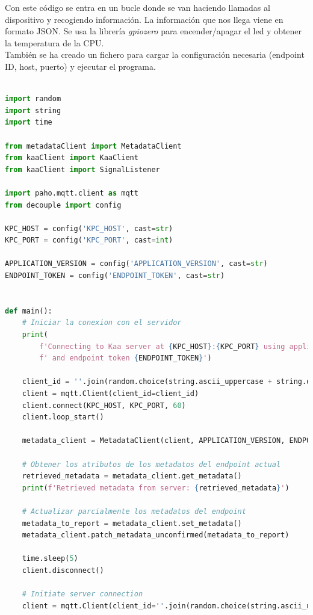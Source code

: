 Con este código se entra en un bucle donde se van haciendo llamadas al dispositivo y recogiendo información. La información que nos llega viene en formato JSON. Se usa la librería \textit{gpiozero} para encender/apagar el led y obtener la temperatura de la CPU. \\

También se ha creado un fichero para cargar la configuración necesaria (endpoint ID, host, puerto) y ejecutar el programa.

\begin{lstlisting}[language=Python]

import random
import string
import time

from metadataClient import MetadataClient
from kaaClient import KaaClient
from kaaClient import SignalListener

import paho.mqtt.client as mqtt
from decouple import config

KPC_HOST = config('KPC_HOST', cast=str)
KPC_PORT = config('KPC_PORT', cast=int)

APPLICATION_VERSION = config('APPLICATION_VERSION', cast=str)
ENDPOINT_TOKEN = config('ENDPOINT_TOKEN', cast=str)


def main():
    # Iniciar la conexion con el servidor
    print(
        f'Connecting to Kaa server at {KPC_HOST}:{KPC_PORT} using application version {APPLICATION_VERSION}'
        f' and endpoint token {ENDPOINT_TOKEN}')

    client_id = ''.join(random.choice(string.ascii_uppercase + string.digits) for _ in range(6))
    client = mqtt.Client(client_id=client_id)
    client.connect(KPC_HOST, KPC_PORT, 60)
    client.loop_start()

    metadata_client = MetadataClient(client, APPLICATION_VERSION, ENDPOINT_TOKEN)

    # Obtener los atributos de los metadatos del endpoint actual
    retrieved_metadata = metadata_client.get_metadata()
    print(f'Retrieved metadata from server: {retrieved_metadata}')

    # Actualizar parcialmente los metadatos del endpoint
    metadata_to_report = metadata_client.set_metadata()
    metadata_client.patch_metadata_unconfirmed(metadata_to_report)

    time.sleep(5)
    client.disconnect()

    # Initiate server connection
    client = mqtt.Client(client_id=''.join(random.choice(string.ascii_uppercase + string.digits) for _ in range(6)))


\end{lstlisting}
